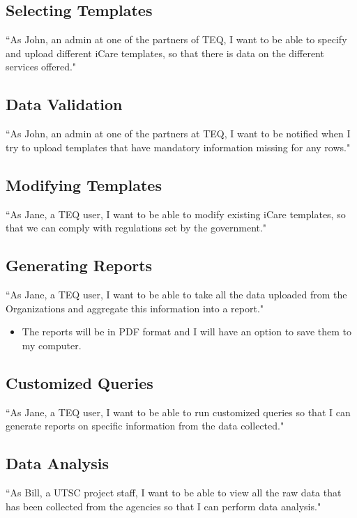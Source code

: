 \documentclass[12pt]{article}
\begin{document}
\subsection{Selecting Templates}
``As John, an admin at one of the partners of TEQ,  I want to be able to specify and upload different iCare templates, so that there is data on the different services offered."

\subsection{Data Validation}
``As John, an admin at one of the partners at TEQ, I want to be notified when I try to upload templates that have mandatory information missing for any rows."

\subsection{Modifying Templates}
``As Jane, a TEQ user,  I want to be able to modify existing iCare templates, so that we can comply with regulations set by the government."

\subsection{Generating Reports}
``As Jane, a TEQ user,  I want to be able to take all the data uploaded from the Organizations and aggregate this information into a report."
\begin{itemize}
\item The reports will be in PDF format and I will have an option to save them to my computer.
\end{itemize}

\subsection{Customized Queries}
``As Jane, a TEQ user, I want to be able to run customized queries so that I can generate reports on specific information from the data collected."

\subsection{Data Analysis}
``As Bill, a UTSC project staff, I want to be able to view all the raw data that has been collected from the agencies so that I can perform data analysis." 

\newpage


\end{document}
